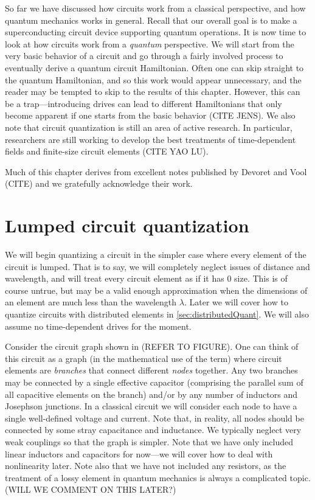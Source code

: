 So far we have discussed how circuits work from a classical perspective, and how quantum mechanics works in general. Recall that our overall goal is to make a superconducting circuit device supporting quantum operations. It is now time to look at how circuits work from a \textit{quantum} perspective. We will start from the very basic behavior of a circuit and go through a fairly involved process to eventually derive a quantum circuit Hamiltonian. Often one can skip straight to the quantum Hamiltonian, and so this work would appear unnecessary, and the reader may be tempted to skip to the results of this chapter. However, this can be a trap---introducing drives can lead to different Hamiltonians that only become apparent if one starts from the basic behavior (CITE JENS). We also note that circuit quantization is still an area of active research. In particular, researchers are still working to develop the best treatments of time-dependent fields and finite-size circuit elements (CITE YAO LU).

Much of this chapter derives from excellent notes published by Devoret and Vool (CITE) and we gratefully acknowledge their work.

\section{Lumped circuit quantization}
We will begin quantizing a circuit in the simpler case where every element of the circuit is lumped. That is to say, we will completely neglect issues of distance and wavelength, and will treat every circuit element as if it has 0 size. This is of course untrue, but may be a valid enough approximation when the dimensions of an element are much less than the wavelength $\lambda$. Later we will cover how to quantize circuits with distributed elements in \cref{sec:distributedQuant}. We will also assume no time-dependent drives for the moment.

Consider the circuit graph shown in (REFER TO FIGURE). One can think of this circuit as a graph (in the mathematical use of the term) where circuit elements are \textit{branches} that connect different \textit{nodes} together. Any two branches may be connected by a single effective capacitor (comprising the parallel sum of all capacitive elements on the branch) and/or by any number of inductors and Josephson junctions. In a classical circuit we will consider each node to have a single well-defined voltage and current. Note that, in reality, all nodes should be connected by some stray capacitance and inductance. We typically neglect very weak couplings so that the graph is simpler. Note that we have only included linear inductors and capacitors for now---we will cover how to deal with nonlinearity later. Note also that we have not included any resistors, as the treatment of a lossy element in quantum mechanics is always a complicated topic. (WILL WE COMMENT ON THIS LATER?)

